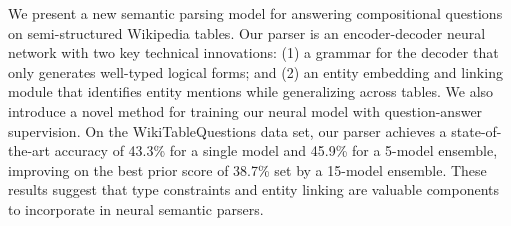 We present a new semantic parsing model for answering compositional questions on semi-structured Wikipedia tables. Our parser is an encoder-decoder neural network with two key technical innovations: (1) a grammar for the decoder that only generates well-typed logical forms; and (2) an entity embedding and linking module that identifies entity mentions while generalizing across tables. We also introduce a novel method for training our neural model with question-answer supervision. On the WikiTableQuestions data set, our parser achieves a state-of-the-art accuracy of 43.3\% for a single model and 45.9\% for a 5-model ensemble, improving on the best prior score of 38.7\% set by a 15-model ensemble. These results suggest that type constraints and entity linking are valuable components to incorporate in neural semantic parsers.
